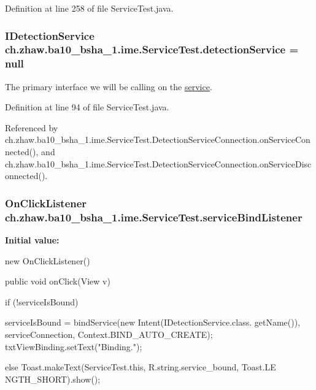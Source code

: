 Definition at line 258 of file ServiceTest.java.\hypertarget{classch_1_1zhaw_1_1ba10__bsha__1_1_1ime_1_1ServiceTest_aa8b6876190c4c3bfdba83a05065ee667}{
\subsubsection[{detectionService}]{\setlength{\rightskip}{0pt plus 5cm}IDetectionService {\bf ch.zhaw.ba10\_\-bsha\_\-1.ime.ServiceTest.detectionService} = null}}
\label{classch_1_1zhaw_1_1ba10__bsha__1_1_1ime_1_1ServiceTest_aa8b6876190c4c3bfdba83a05065ee667}
The primary interface we will be calling on the \hyperlink{namespacech_1_1zhaw_1_1ba10__bsha__1_1_1service}{service}. 

Definition at line 94 of file ServiceTest.java.

Referenced by ch.zhaw.ba10\_\-bsha\_\-1.ime.ServiceTest.DetectionServiceConnection.onServiceConnected(), and ch.zhaw.ba10\_\-bsha\_\-1.ime.ServiceTest.DetectionServiceConnection.onServiceDisconnected().\hypertarget{classch_1_1zhaw_1_1ba10__bsha__1_1_1ime_1_1ServiceTest_a4fd63657e481b0a7fa19836a9bfad101}{
\subsubsection[{serviceBindListener}]{\setlength{\rightskip}{0pt plus 5cm}OnClickListener {\bf ch.zhaw.ba10\_\-bsha\_\-1.ime.ServiceTest.serviceBindListener}}}
\label{classch_1_1zhaw_1_1ba10__bsha__1_1_1ime_1_1ServiceTest_a4fd63657e481b0a7fa19836a9bfad101}
{\bfseries Initial value:}
\begin{DoxyCode}
 new OnClickListener() {
        public void onClick(View v) {
            if (!serviceIsBound) {
                    
                    
                    
                    
                serviceIsBound =  bindService(new Intent(IDetectionService.class.
      getName()), serviceConnection, Context.BIND_AUTO_CREATE);
                    txtViewBinding.setText("Binding.");
            } else {
                Toast.makeText(ServiceTest.this, R.string.service_bound, Toast.LE
      NGTH_SHORT).show();
            }
        }
    }
\end{DoxyCode}


